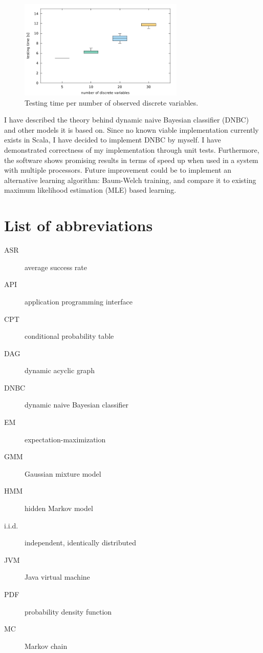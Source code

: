 \documentclass[thesis=B,english]{FITthesis}[2012/06/26]
\begin{document}
\begin{figure}
	\centering
 	\includegraphics[width=0.7\textwidth]{discrete_variables_testing_time}
 	\caption{Testing time per number of observed discrete variables.}
 	\label{fig:discrete_variables_testing_time}
\end{figure}

\begin{conclusion}
I have described the theory behind dynamic naive Bayesian classifier (DNBC) and other models it is based on. Since no known viable implementation currently exists in Scala, I have decided to implement DNBC by myself. I have demonstrated correctness of my implementation through unit tests. Furthermore, the software shows promising results in terms of speed up when used in a system with multiple processors. Future improvement could be to implement an alternative learning algorithm: Baum-Welch training, and compare it to existing maximum likelihood estimation (MLE) based learning.
\end{conclusion}




\appendix

\chapter{List of abbreviations}
\begin{description}
	\item[ASR] average success rate
	\item[API] application programming interface
	\item[CPT] conditional probability table
	\item[DAG] dynamic acyclic graph
	\item[DNBC] dynamic naive Bayesian classifier
	\item[EM] expectation-maximization
	\item[GMM] Gaussian mixture model
	\item[HMM] hidden Markov model
	\item[i.i.d.] independent, identically distributed
	\item[JVM] Java virtual machine
	\item[PDF] probability density function
	\item[MC] Markov chain
\end{description}
\end{document}
